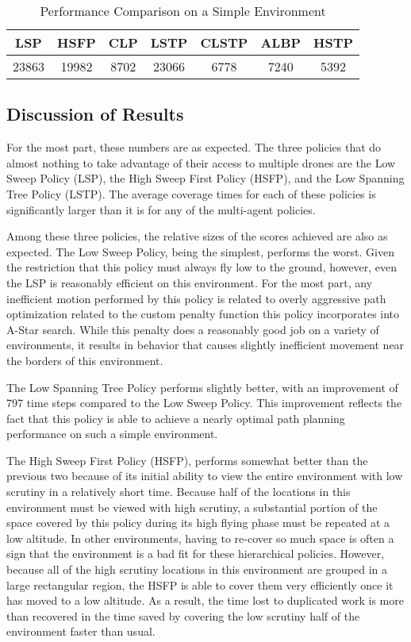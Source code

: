 \begin{table}[h]
\begin{center}
 \begin{tabular}{||c c c c c c c ||}
 \hline
 LSP   & HSFP  & CLP  & LSTP  & CLSTP & ALBP & HSTP \\
 \hline
 23863 & 19982 & 8702 & 23066 & 6778  & 7240 & 5392 \\
 \hline
 \end{tabular}
\end{center}
\caption{Performance Comparison on a Simple Environment}
\end{table}

\subsection{Discussion of Results}

For the most part, these numbers are as expected. The three policies that do almost nothing to take advantage of their access to multiple drones are the Low Sweep Policy (LSP), the High Sweep First Policy (HSFP), and the Low Spanning Tree Policy (LSTP). The average coverage times for each of these policies is significantly larger than it is for any of the multi-agent policies.

Among these three policies, the relative sizes of the scores achieved are also as expected. The Low Sweep Policy, being the simplest, performs the worst. Given the restriction that this policy must always fly low to the ground, however, even the LSP is reasonably efficient on this environment. For the most part, any inefficient motion performed by this policy is related to overly aggressive path optimization related to the custom penalty function this policy incorporates into A-Star search. While this penalty does a reasonably good job on a variety of environments, it results in behavior that causes slightly inefficient movement near the borders of this environment.

The Low Spanning Tree Policy performs slightly better, with an improvement of 797 time steps compared to the Low Sweep Policy. This improvement reflects the fact that this policy is able to achieve a nearly optimal path planning performance on such a simple environment.

The High Sweep First Policy (HSFP), performs somewhat better than the previous two because of its initial ability to view the entire environment with low scrutiny in a relatively short time. Because half of the locations in this environment must be viewed with high scrutiny, a substantial portion of the space covered by this policy during its high flying phase must be repeated at a low altitude. In other environments, having to re-cover so much space is often a sign that the environment is a bad fit for these hierarchical policies. However, because all of the high scrutiny locations in this environment are grouped in a large rectangular region, the HSFP is able to cover them very efficiently once it has moved to a low altitude. As a result, the time lost to duplicated work is more than recovered in the time saved by covering the low scrutiny half of the environment faster than usual.

